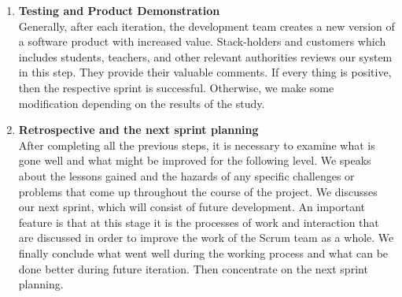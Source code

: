 \begin{enumerate}

\item \textbf{Testing and Product Demonstration}\\

Generally, after each iteration, the development team creates a new version of a software product with increased value. Stack-holders and customers which includes students, teachers, and other relevant authorities reviews our system in this step. They provide their valuable comments. If every thing is positive, then the respective sprint is successful. Otherwise, we make some modification depending on the results of the study.

\item \textbf{Retrospective and the next sprint planning}\\

After completing all the previous steps, it is necessary to examine what is gone well and what might be improved for the following level. We speaks about the lessons gained and the hazards of any specific challenges or problems that come up throughout the course of the project. We discusses our next sprint, which will consist of future development. An important feature is that at this stage it is the processes of work and interaction that are discussed in order to improve the work of the Scrum team as a whole. We finally conclude what went well during the working process and what can be done better during future iteration. Then concentrate on the next sprint planning.

\end{enumerate}


\clearpage